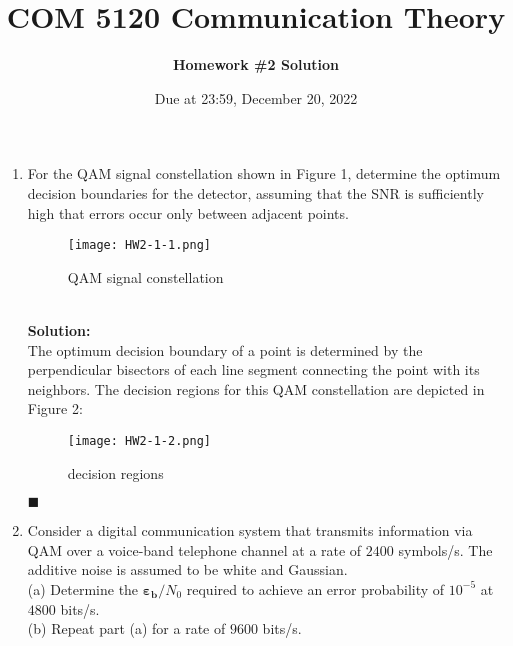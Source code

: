 \documentclass[a4paper,12pt]{article}
\title{\textbf{COM 5120 Communication Theory}}
\author{\textbf{Homework \#2 Solution}}
\date{Due at 23:59, December 20, 2022}
\begin{document}
    \maketitle


    \begin{enumerate}
        \item 
            For the QAM signal constellation shown in Figure 1, determine the optimum decision boundaries for the detector, assuming that the SNR is sufficiently high that errors occur only between adjacent points.
            \begin{figure}[h]
            	\centering
            	\texttt{[image: HW2-1-1.png]}
            	\caption{QAM signal constellation}
            \end{figure} \\
            \textbf{Solution:} \\
            The optimum decision boundary of a point is determined by the perpendicular bisectors of each line segment connecting the point with its neighbors. The decision regions for this QAM constellation are depicted in Figure 2: \\ 
            \begin{figure}[h]
            	\centering
            	\texttt{[image: HW2-1-2.png]}
            	\caption{decision regions}
            \end{figure}
            \begin{flushright}
                $\blacksquare$
            \end{flushright}
        \item
            Consider a digital communication system that transmits information via QAM over a voice-band telephone channel at a rate of $2400$ symbols/s. The additive noise is assumed to be white and Gaussian. \\
            (a) Determine the $\bm{\varepsilon_b} / N_0$ required to achieve an error probability of $10^{-5}$ at $4800$ bits/s. \\ 
            (b) Repeat part (a) for a rate of $9600$ bits/s. \\ 

\end{enumerate}
\end{document}
